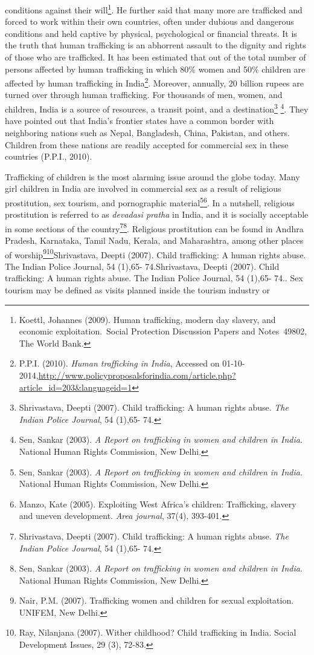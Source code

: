 \begin{multicols}{2}
\noi
conditions against their will\footnote{Koettl, Johannes (2009). Human trafficking, modern day slavery, and economic exploitation. Social Protection Discussion Papers and Notes 49802, The World Bank.}. He further said that many more are trafficked and forced to work within their own countries, often under dubious and dangerous conditions and held captive by physical, psychological or financial threats. It is the truth that human trafficking is an abhorrent assault to the dignity and rights of those who are trafficked. It has been estimated that out of the total number of persons affected by human trafficking in which 80\% women and 50\% children are affected by human trafficking in India\footnote{P.P.I. (2010). {\it Human trafficking in India}, Accessed on 01-10-2014,\url{http://www.policyproposalsforindia.com/article.php?article_id=203&languageid=1}}. Moreover, annually, 20 billion rupees are turned over through human trafficking. For thousands of men, women, and children, India is a source of resources, a transit point, and a destination\footnote{Shrivastava, Deepti (2007). Child trafficking: A human rights abuse. \textit{The Indian Police Journal}, 54 (1),65- 74.} \footnote{Sen, Sankar (2003). \textit{A Report on trafficking in women and children in India}. National Human Rights Commission, New Delhi.}. They have pointed out that India's frontier states have a common border with neighboring nations such as Nepal, Bangladesh, China, Pakistan, and others. Children from these nations are readily accepted for commercial sex in these countries (P.P.I., 2010).

\noi
Trafficking of children is the most alarming issue around the globe today. Many girl children in India are involved in commercial sex as a result of religious prostitution, sex tourism, and pornographic material\footnote{Sen, Sankar (2003). \textit{A Report on trafficking in women and children in India.} National Human Rights Commission, New Delhi.}\footnote{Manzo, Kate (2005). Exploiting West Africa’s children: Trafficking, slavery and uneven development. \textit{Area journal}, 37(4), 393-401.}. In a nutshell, religious prostitution is referred to as \textit{devadasi pratha} in India, and it is socially acceptable in some sections of the country\footnote{Shrivastava, Deepti (2007). Child trafficking: A human rights abuse. \textit{The Indian Police Journal}, 54 (1),65- 74.}\footnote{Sen, Sankar (2003). \textit{A Report on trafficking in women and children in India.} National Human Rights Commission, New Delhi.}. Religious prostitution can be found in Andhra Pradesh, Karnataka, Tamil Nadu, Kerala, and Maharashtra, among other places of worship\footnote{Nair, P.M. (2007). Trafficking women and children for sexual exploitation. UNIFEM, New Delhi.}\footnote{Ray, Nilanjana (2007). Wither childhood? Child trafficking in India. Social Development Issues, 29 (3), 72-83.}Shrivastava, Deepti (2007). Child trafficking: A human rights abuse. The Indian Police Journal, 54 (1),65- 74.Shrivastava, Deepti (2007). Child trafficking: A human rights abuse. The Indian Police Journal, 54 (1),65- 74.. Sex tourism may be defined as visits planned inside the tourism industry or 


\end{multicols}

